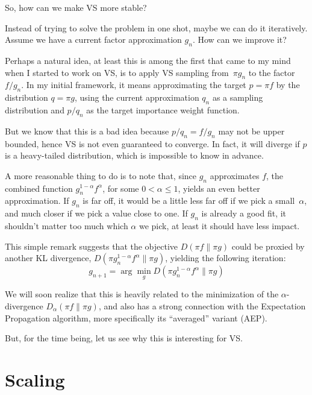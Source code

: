 \documentclass{article}
\begin{document}
So, how can we make VS more stable?

Instead of trying to solve the problem in one shot, maybe we can do it iteratively. Assume we have a current factor approximation $g_n$. How can we improve it?

Perhaps a natural idea, at least this is among the first that came to my mind when I started to work on VS, is to apply VS sampling from~$\pi g_n$ to the factor $f/g_n$. In my initial framework, it means approximating the target $p=\pi f$ by the distribution $q=\pi g$, using the current approximation $q_n$ as a sampling distribution and $p/q_n$ as the target importance weight function.

But we know that this is a bad idea because $p/q_n=f/g_n$ may not be upper bounded, hence VS is not even guaranteed to converge. In fact, it will diverge if $p$ is a heavy-tailed distribution, which is impossible to know in advance.

A more reasonable thing to do is to note that, since $g_n$ approximates $f$, the combined function $g_n^{1-\alpha}f^\alpha$, for some $0< \alpha\leq 1$, yields an even better approximation. If $g_n$ is far off, it would be a little less far off if we pick a small~$\alpha$, and much closer if we pick a value close to one. If $g_n$ is already a good fit, it shouldn't matter too much which $\alpha$ we pick, at least it should have less impact.

This simple remark suggests that the objective $D(\pi f\|\pi g)$ could be proxied by another KL divergence, $D(\pi g_n^{1-\alpha}f^\alpha \| \pi g)$, yielding the following iteration:
$$
g_{n+1} = \arg\min_g D(\pi g_n^{1-\alpha}f^\alpha \| \pi g)
$$

We will soon realize that this is heavily related to the minimization of the $\alpha$-divergence $D_\alpha(\pi f\|\pi g)$, and also has a strong connection with the Expectation Propagation algorithm, more specifically its ``averaged'' variant (AEP). 

But, for the time being, let us see why this is interesting for VS. 


\section{Scaling}
\end{document}
